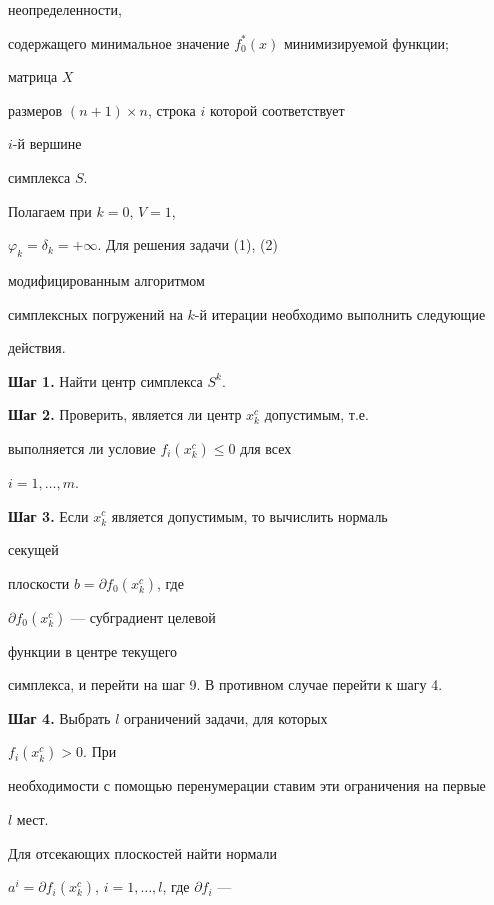 неопределенности,


содержащего минимальное значение $f^*_0(x)$ минимизируемой функции;


матрица $X$


размеров $(n+1)\times n$, строка $i$ которой соответствует


$i$-й вершине


симплекса $S$.





Полагаем при $k=0$, $V=1$,


$\varphi_k=\delta_k=+\infty$. Для решения задачи (1), (2)


модифицированным алгоритмом


симплексных погружений на $k$-й итерации необходимо выполнить следующие


действия.





{\bf Шаг 1.} Найти центр симплекса $S^k$.





{\bf Шаг 2.} Проверить, является ли центр $x^c_k$ допустимым, т.е.


выполняется ли условие $f_i(x^c_k)\le 0$ для всех


$i=1,\dotsc,m$.





{\bf Шаг 3.} Если $x^c_k$ является допустимым, то вычислить нормаль


секущей


плоскости $b=\partial f_0(x^c_k)$, где


$\partial f_0(x^c_k)$ --- субградиент целевой


функции в центре текущего


симплекса, и перейти на шаг 9. В противном случае перейти к шагу 4.





{\bf Шаг 4.} Выбрать $l$ ограничений задачи, для которых


$f_i(x^c_k)>0$. При


необходимости с помощью перенумерации ставим эти ограничения на первые


$l$ мест.





Для отсекающих плоскостей найти нормали


$a^i=\partial f_i(x^c_k)$, $i=1,\dotsc,l$, где $\partial f_i$ ---


